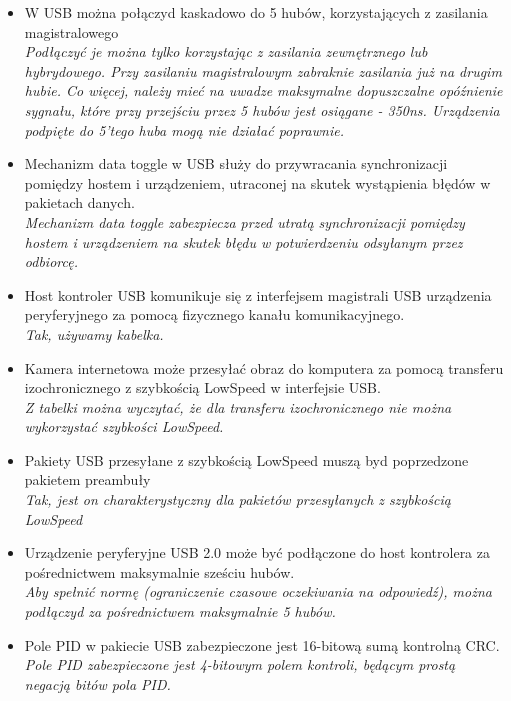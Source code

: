 \begin{itemize}
	\item \textcolor{nie}{W USB można połączyd kaskadowo do 5 hubów, korzystających z zasilania magistralowego} \\
	{\small \emph{Podłączyć je można tylko korzystając z zasilania zewnętrznego lub hybrydowego. Przy zasilaniu magistralowym zabraknie zasilania już na drugim hubie. Co więcej, należy mieć na uwadze maksymalne dopuszczalne opóźnienie sygnału, które przy przejściu przez 5 hubów jest osiągane - 350ns. Urządzenia podpięte do 5'tego huba mogą nie działać poprawnie.}}
	
	\item \textcolor{nie}{Mechanizm data toggle w USB służy do przywracania synchronizacji pomiędzy hostem i urządzeniem, utraconej na skutek wystąpienia błędów w pakietach danych.} \\
	{\small \emph{Mechanizm data toggle zabezpiecza przed utratą synchronizacji pomiędzy hostem i urządzeniem na skutek błędu w potwierdzeniu odsyłanym przez odbiorcę.}}
	
	\item \textcolor{tak}{Host kontroler USB komunikuje się z interfejsem magistrali USB urządzenia peryferyjnego za pomocą fizycznego kanału komunikacyjnego.} \\
	{\small \emph{Tak, używamy kabelka.}}
	
	\item \textcolor{nie}{Kamera internetowa może przesyłać obraz do komputera za pomocą transferu izochronicznego z szybkością LowSpeed w interfejsie USB.} \\
	{\small \emph{Z tabelki można wyczytać, że dla transferu izochronicznego nie można wykorzystać szybkości LowSpeed.}}
	
	\item \textcolor{tak}{Pakiety USB przesyłane z szybkością LowSpeed muszą byd poprzedzone pakietem preambuły} \\
	{\small \emph{Tak, jest on charakterystyczny dla pakietów przesyłanych z szybkością LowSpeed}}
	
	\item \textcolor{nie}{Urządzenie peryferyjne USB 2.0 może być podłączone do host kontrolera za pośrednictwem maksymalnie sześciu hubów.} \\
	{\small \emph{Aby spełnić normę (ograniczenie czasowe oczekiwania na odpowiedź), można podłączyd za pośrednictwem maksymalnie 5 hubów.}}
	
	\item \textcolor{nie}{Pole PID w pakiecie USB zabezpieczone jest 16-bitową sumą kontrolną CRC.} \\
	{\small \emph{Pole PID zabezpieczone jest 4-bitowym polem kontroli, będącym prostą negacją bitów pola PID.}}
	

\end{itemize}

